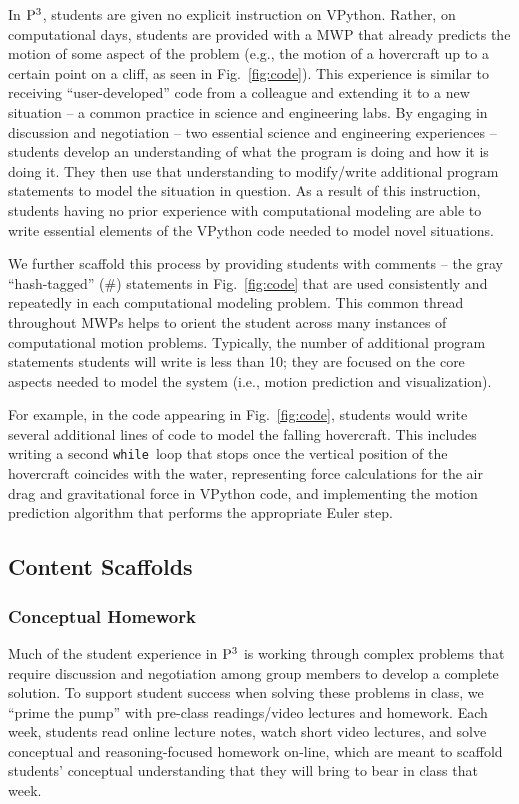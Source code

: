 \documentclass{msuphddissertation}
\begin{document}
\begin{doublespace}
In ${\rm P}^{3}$, students are given no explicit instruction on VPython.  Rather, on computational days, students are provided with a MWP that already predicts the motion of some aspect of the problem (e.g., the motion of a hovercraft up to a certain point on a cliff, as seen in Fig.~\ref{fig:code}).  This experience is similar to receiving ``user-developed'' code from a colleague and extending it to a new situation -- a common practice in science and engineering labs.  By engaging in discussion and negotiation -- two essential science and engineering experiences -- students develop an understanding of what the program is doing and how it is doing it.  They then use that understanding to modify/write additional program statements to model the situation in question.  As a result of this instruction, students having no prior experience with computational modeling are able to write essential elements of the VPython code needed to model novel situations.

We further scaffold this process by providing students with comments -- the gray ``hash-tagged'' (\#) statements in Fig.~\ref{fig:code} that are used consistently and repeatedly in each computational modeling problem.  This common thread throughout MWPs helps to orient the student across many instances of computational motion problems.  Typically, the number of additional program statements students will write is less than 10; they are focused on the core aspects needed to model the system (i.e., motion prediction and visualization).

For example, in the code appearing in Fig.~\ref{fig:code}, students would write several additional lines of code to model the falling hovercraft.  This includes writing a second {\tt while}~loop that stops once the vertical position of the hovercraft coincides with the water, representing force calculations for the air drag and gravitational force in VPython code, and implementing the motion prediction algorithm that performs the appropriate Euler step. 

\subsection{Content Scaffolds}

\subsubsection{Conceptual Homework}

Much of the student experience in ${\rm P}^{3}$ is working through complex problems that require discussion and negotiation among group members to develop a complete solution.  To support student success when solving these problems in class, we ``prime the pump'' with pre-class readings/video lectures and homework.  Each week, students read online lecture notes, watch short video lectures, and solve conceptual and reasoning-focused homework on-line, which are meant to scaffold students' conceptual understanding that they will bring to bear in class that week.


\end{doublespace}
\end{document}
